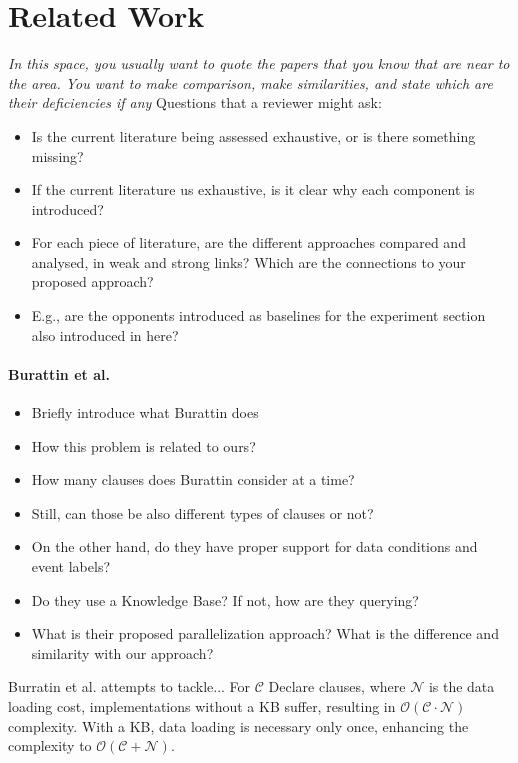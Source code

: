\section{Related Work}
\textit{In this space, you usually want to quote the papers that you know that are near to the area. You want to make comparison, make similarities, and state which are their deficiencies if any} Questions that a reviewer might ask:
\begin{itemize}
	\item Is the current literature being assessed exhaustive, or is there something missing?
	\item If the current literature us exhaustive, is it clear why each component is introduced?
	\item For each piece of literature, are the different approaches compared and analysed, in weak and strong links? Which are the connections to your proposed approach?
	\item E.g., are the opponents introduced as baselines for the experiment section also introduced in here?
\end{itemize}

\paragraph*{Burattin et al.} \cite{BurattinMS16}
\begin{itemize}
	\item{Briefly introduce what Burattin does}
	\item{How this problem is related to ours?}
	\item{How many clauses does Burattin consider at a time?}
	\item{Still, can those be also different types of clauses or not?}
	\item{On the other hand, do they have proper support for data conditions and event labels?}
	\item{Do they use a Knowledge Base? If not, how are they querying?}
	\item{What is their proposed parallelization approach? What is the difference and similarity with our approach?}
\end{itemize}
Burratin et al. attempts to tackle... For $\mathcal{C}$ Declare clauses, where $\mathcal{N}$ is the data loading cost, implementations without a KB suffer, resulting in $\mathcal{O(C \cdot N)}$ complexity. With a KB, data loading is necessary only once, enhancing the complexity to $\mathcal{O(C + N)}$.

